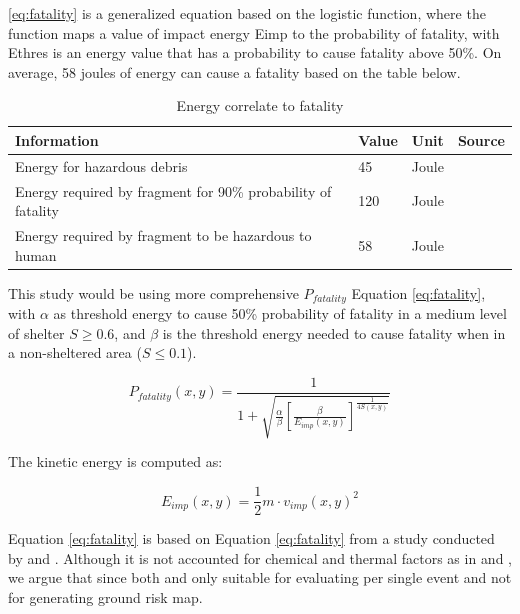 \documentclass[12pt]{report}
\begin{document}
        \ref{eq:fatality} is a generalized equation based on the logistic function, where the function maps a value of
        impact energy Eimp to the probability of fatality, with Ethres is an energy value that has a probability to
        cause fatality above 50\%. On average, 58 joules of energy can cause a fatality based on the table below.

        \begin{table}[H]
            \centering
            \begin{tabular}{|p{6cm}|p{1.5cm}|p{1.5cm}|p{4cm}|}
                \hline
                Information & Value & Unit & Source \\
                \hline
                Energy for hazardous debris & 45 & Joule & \cite{cole_hazards_1997} \\
                \hline
                Energy required by fragment for 90\% probability of fatality & 120 & Joule & \cite{cole_hazards_1997} \\
                \hline
                Energy required by fragment to be hazardous to human & 58 & Joule & \cite{gonzales_faas_2017} \\
                \hline
            \end{tabular}
            \caption{Energy correlate to fatality}
        \end{table}

        This study would be using more comprehensive $P_{fatality}$ Equation \ref{eq:fatality}, with $\alpha$ as
        threshold energy to cause 50\% probability of fatality in a medium level of shelter $S \geq 0.6$, and $\beta$ is
        the threshold energy needed to cause fatality when in a non-sheltered area ($S \leq 0.1$).

        \begin{equation}\label{eq:fatality}
        P_{fatality}(x, y) = \frac{1}{1 + \sqrt{\frac{\alpha}{\beta} \left[ \frac{\beta}{E_{imp}(x,y)} \right]^{\frac{1}{4S(x,y)}}}}
        \end{equation}
        
        The kinetic energy is computed as:
        
        \begin{equation}\label{eq:kinetic_energy}
        E_{imp}(x, y) = \frac{1}{2} m \cdot v_{imp}(x, y)^2
        \end{equation}
        
        Equation \ref{eq:fatality} is based on Equation \ref{eq:fatality} from a study conducted by \cite{dalamagkidis_evaluating_2008} and \cite{primatesta_ground_2020}.
        Although it is not accounted for chemical and thermal factors as in \cite{melnyk_third-party_2014} and \cite{harwick_approved_2007}, we argue that since both \cite{melnyk_third-party_2014}
        and \cite{harwick_approved_2007} only suitable for evaluating per single event and not for generating ground risk map.
\end{document}
